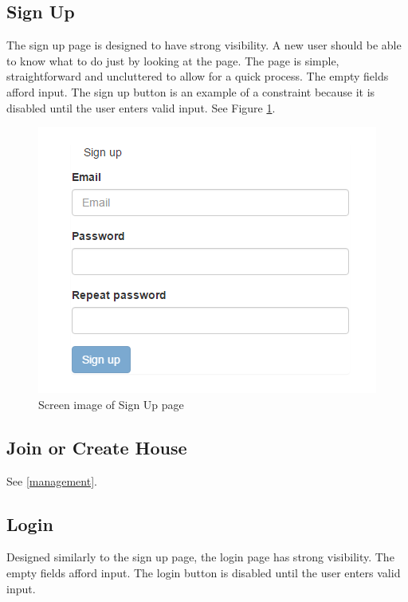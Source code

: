 \documentclass[12pt]{article}
\begin{document}
\subsection{Sign Up}
The sign up page is designed to have strong visibility. A new user should be able to know what to do just by looking at the page. The page is simple, straightforward and uncluttered to allow for a quick process. The empty fields afford input. The sign up button is an example of a constraint because it is disabled until the user enters valid input. See Figure \ref{fig:signup}.

\begin{figure}
\centering
\includegraphics{signup}
\caption{Screen image of Sign Up page}
\label{fig:signup}
\end{figure}

\subsection{Join or Create House}
See \ref{management}.

\subsection{Login}
Designed similarly to the sign up page, the login page has strong visibility. The empty fields afford input. The login button is disabled until the user enters valid input.
\end{document}
